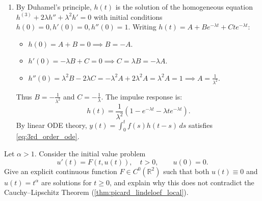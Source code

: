 \begin{exercisesolution}
\begin{enumerate}[label=\textbf{(\alph*)}]
  \item By Duhamel's principle, $h(t)$ is the solution of the homogeneous equation $h^{(3)} + 2\lambda h'' + \lambda^2 h' = 0$ with initial conditions $h(0) = 0, h'(0) = 0, h''(0) = 1$.
Writing $h(t) = A + B e^{-\lambda t} + C t e^{-\lambda t}$:
\begin{itemize}
  \item $h(0) = A + B = 0 \implies B = -A$.
  \item $h'(0) = -\lambda B + C = 0 \implies C = \lambda B = -\lambda A$.
  \item $h''(0) = \lambda^2 B - 2\lambda C = -\lambda^2 A + 2\lambda^2 A = \lambda^2 A = 1 \implies A = \frac{1}{\lambda^2}$.
\end{itemize}
Thus $B = -\frac{1}{\lambda^2}$ and $C = -\frac{1}{\lambda}$.
The impulse response is:
\[h(t) = \frac{1}{\lambda^2} \left(1 - e^{-\lambda t} - \lambda t e^{-\lambda t}\right).\]
By linear ODE theory, $y(t) = \int_0^t f(s) h(t-s) \, ds$ satisfies \eqref{eq:3rd_order_ode}.
\end{enumerate}
\end{exercisesolution}


\begin{exercise}
\label{ex:cauchy_lipschitz_nonuniqueness_power}
Let $\alpha > 1$. Consider the initial value problem
\[u'(t) = F(t, u(t)), \quad t > 0, \qquad u(0) = 0.\]
Give an explicit continuous function $F \in C^0(\mathbb{R}^2)$ such that both $u(t) \equiv 0$ and $u(t) = t^\alpha$ are solutions for $t \ge 0$, and explain why this does not contradict the Cauchy--Lipschitz Theorem (\cref{thm:picard_lindeloef_local}).
\end{exercise}

